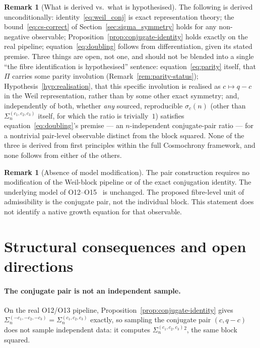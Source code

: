 \documentclass[11pt,a4paper]{article}
\theoremstyle{definition}
\newtheorem{remark}[theorem]{Remark}
\begin{document}
  \begin{remark}[What is derived vs.\ what is hypothesised]
    \label{rem:status}
    The following is derived unconditionally: identity~\eqref{eq:weil_conj}
    is exact representation theory; the bound~\eqref{eq:cs-correct} of
    Section~\ref{sec:sigma_symmetry} holds for any non-negative observable;
    Proposition~\ref{prop:conjugate-identity} holds exactly on the real
    pipeline; equation~\eqref{eq:doubling} follows from differentiation,
    given its stated premise.
    Three things are open, not one, and should not be blended into a
    single ``the fibre identification is hypothesised'' sentence:
    equation~\eqref{eq:parity} itself, that $\Pi$ carries some parity
    involution (Remark~\ref{rem:parity-status}); Hypothesis~\ref{hyp:realisation},
    that this specific involution is realised as $c\mapsto q-c$ in the
    Weil representation, rather than by some other exact symmetry; and,
    independently of both, whether \emph{any} sourced, reproducible
    $\sigma_c(n)$ (other than $\Sigma_n^{(c_1,c_2,c_3)}$ itself, for
    which the ratio is trivially~$1$) satisfies
    equation~\eqref{eq:doubling}'s premise --- an $n$-independent
    conjugate-pair ratio --- for a nontrivial pair-level observable
    distinct from the block squared.
    None of the three is derived from first principles within the full
    Cosmochrony framework, and none follows from either of the others.
  \end{remark}

  \begin{remark}[Absence of model modification]
The pair construction requires no modification of the Weil-block
pipeline or of the exact conjugation identity.
The underlying model of O12--O15~\cite{Beau2026a16,Beau2026a17,Beau2026a18,Beau2026a19} is unchanged.
The proposed fibre-level unit of admissibility is the conjugate pair,
not the individual block.
This statement does not identify a native growth equation for that
observable.
  \end{remark}

  \section{Structural consequences and open directions}
  \label{sec:implications}

  \paragraph{The conjugate pair is not an independent sample.}
    On the real O12/O13 pipeline, Proposition~\ref{prop:conjugate-identity}
    gives $\Sigma_n^{(-c_1,-c_2,-c_3)} = \Sigma_n^{(c_1,c_2,c_3)}$
    exactly, so sampling the conjugate pair $(c,q-c)$ does not sample
    independent data: it computes $\Sigma_n^{(c_1,c_2,c_3)}{}^2$, the
    same block squared.
\end{document}
